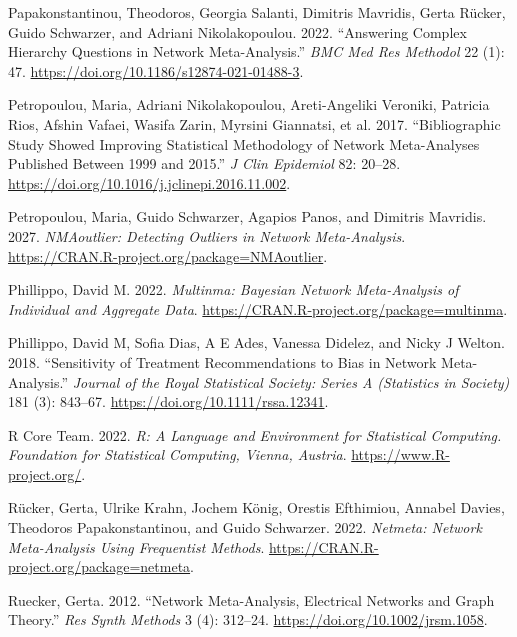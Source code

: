 \begin{CSLReferences}{1}{0}
\leavevmode{}%
Papakonstantinou, Theodoros, Georgia Salanti, Dimitris Mavridis, Gerta Rücker, Guido Schwarzer, and Adriani Nikolakopoulou. 2022. {``Answering Complex Hierarchy Questions in Network Meta-Analysis.''} \emph{BMC Med Res Methodol} 22 (1): 47. \url{https://doi.org/10.1186/s12874-021-01488-3}.

\leavevmode{}%
Petropoulou, Maria, Adriani Nikolakopoulou, Areti-Angeliki Veroniki, Patricia Rios, Afshin Vafaei, Wasifa Zarin, Myrsini Giannatsi, et al. 2017. {``Bibliographic Study Showed Improving Statistical Methodology of Network Meta-Analyses Published Between 1999 and 2015.''} \emph{J Clin Epidemiol} 82: 20--28. \url{https://doi.org/10.1016/j.jclinepi.2016.11.002}.

\leavevmode{}%
Petropoulou, Maria, Guido Schwarzer, Agapios Panos, and Dimitris Mavridis. 2027. \emph{NMAoutlier: Detecting Outliers in Network Meta-Analysis}. \url{https://CRAN.R-project.org/package=NMAoutlier}.

\leavevmode{}%
Phillippo, David M. 2022. \emph{Multinma: Bayesian Network Meta-Analysis of Individual and Aggregate Data}. \url{https://CRAN.R-project.org/package=multinma}.

\leavevmode{}%
Phillippo, David M, Sofia Dias, A E Ades, Vanessa Didelez, and Nicky J Welton. 2018. {``Sensitivity of Treatment Recommendations to Bias in Network Meta-Analysis.''} \emph{Journal of the Royal Statistical Society: Series A (Statistics in Society)} 181 (3): 843--67. \url{https://doi.org/10.1111/rssa.12341}.

\leavevmode{}%
R Core Team. 2022. \emph{{R: A Language and Environment for Statistical Computing}. Foundation for Statistical Computing, Vienna, Austria}. \url{https://www.R-project.org/}.

\leavevmode{}%
Rücker, Gerta, Ulrike Krahn, Jochem König, Orestis Efthimiou, Annabel Davies, Theodoros Papakonstantinou, and Guido Schwarzer. 2022. \emph{Netmeta: Network Meta-Analysis Using Frequentist Methods}. \url{https://CRAN.R-project.org/package=netmeta}.

\leavevmode{}%
Ruecker, Gerta. 2012. {``Network Meta-Analysis, Electrical Networks and Graph Theory.''} \emph{Res Synth Methods} 3 (4): 312--24. \url{https://doi.org/10.1002/jrsm.1058}.


\end{CSLReferences}
